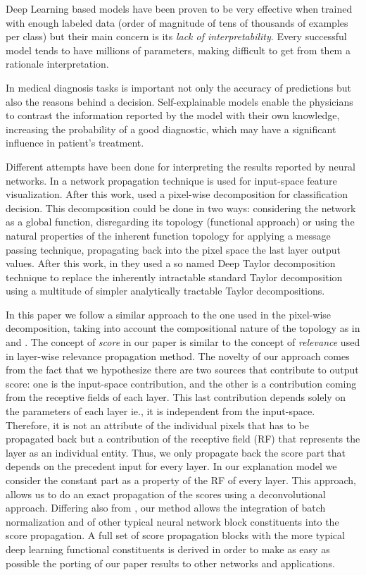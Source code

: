 \documentclass[review]{elsarticle}
\theoremstyle{definition} %
\theoremstyle{remark}
\begin{document}
Deep Learning based models have been proven to be very effective when trained with enough labeled data (order of magnitude of tens of thousands of examples per class) but their main concern is its \emph{lack of interpretability}. Every successful model tends to have millions of parameters, making difficult to get from them a rationale interpretation. 

In medical diagnosis tasks is important not only the accuracy of predictions but also the reasons behind a decision. Self-explainable models enable the physicians to contrast the information reported by the model with their own knowledge, increasing the probability of a good diagnostic, which may have a significant influence in patient's treatment.  

Different attempts have been done for interpreting the results reported by neural networks. In \cite{zeiler2014visualizing} a network propagation technique is used for input-space feature visualization. After this work, \cite{bach2015pixel} used a pixel-wise decomposition for classification decision. This decomposition could be done in two ways: considering the network as a global function, disregarding its topology (functional approach) or using the natural properties of the inherent function topology for applying a message passing technique, propagating back into the pixel space the last layer output values. After this work, in \cite{montavon2017explaining} they used a so named Deep Taylor decomposition technique to replace the inherently intractable standard Taylor decomposition using a multitude of simpler analytically tractable Taylor decompositions.

In this paper we follow a similar approach to the one used in the pixel-wise decomposition, taking into account the compositional nature of the topology as in \cite{zeiler2014visualizing} and \cite{bach2015pixel}. The concept of \emph{score} in our paper is similar to the concept of \emph{relevance} used in layer-wise relevance propagation method. The novelty of our approach comes from the fact that we hypothesize there are two sources that contribute to output score: one is the input-space contribution, and the other is a contribution coming from the receptive fields of each layer. This last contribution depends solely on the parameters of each layer ie., it is independent from the input-space. Therefore, it is not an attribute of the individual pixels that has to be propagated back but a contribution of the receptive field (RF) that represents the layer as an individual entity. Thus, we only propagate back the score part that depends on the precedent input for every layer. In our explanation model we consider the constant part as a property of the RF of every layer. This approach, allows us to do an exact propagation of the scores using a deconvolutional approach. Differing also from \cite{zeiler2014visualizing}, our method allows the integration of batch normalization and of other typical neural network block constituents into the score propagation. A full set of score propagation blocks with the more typical deep learning functional constituents is derived in order to make as easy as possible the porting of our paper results to other networks and applications.
\end{document}
